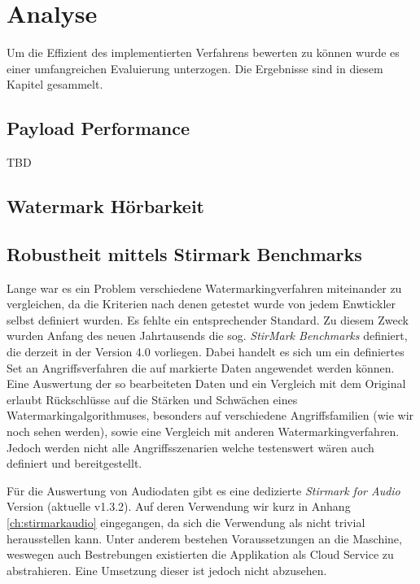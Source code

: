 \chapter{Analyse}
\label{ch:analyse}

Um die Effizient des implementierten Verfahrens bewerten zu können wurde es einer umfangreichen Evaluierung unterzogen. Die Ergebnisse sind in diesem Kapitel gesammelt. 

\section{Payload Performance}
\label{sec:payloadperformance}

TBD

\section{Watermark Hörbarkeit}

\section{Robustheit mittels Stirmark Benchmarks}

Lange war es ein Problem verschiedene Watermarkingverfahren miteinander zu vergleichen, da die Kriterien nach denen getestet wurde von jedem Enwtickler selbst definiert wurden. Es fehlte ein entsprechender Standard. Zu diesem Zweck wurden Anfang des neuen Jahrtausends die sog. \textit{StirMark Benchmarks} definiert\cite{petitcolas2000watermarking}\cite{petitcolas2004stirmark}, die derzeit in der Version 4.0 vorliegen. Dabei handelt es sich um ein definiertes Set an Angriffsverfahren die auf markierte Daten angewendet werden können. Eine Auswertung der so bearbeiteten Daten und ein Vergleich mit dem Original erlaubt Rückschlüsse auf die Stärken und Schwächen eines Watermarkingalgorithmuses, besonders auf verschiedene Angriffsfamilien (wie wir noch sehen werden), sowie eine Vergleich mit anderen Watermarkingverfahren. Jedoch werden nicht alle Angriffsszenarien welche testenswert wären auch definiert und bereitgestellt\cite{steinebach2002stirmark}.

Für die Auswertung von Audiodaten gibt es eine dedizierte \textit{Stirmark for Audio} Version\cite{stirmarkforaudio} (aktuelle v1.3.2). Auf deren Verwendung wir kurz in Anhang \ref{ch:stirmarkaudio} eingegangen, da sich die Verwendung als nicht trivial herausstellen kann. Unter anderem bestehen Voraussetzungen an die Maschine, weswegen auch Bestrebungen existierten die Applikation als Cloud Service zu abstrahieren\cite{petitcolas2001public}. Eine Umsetzung dieser ist jedoch nicht abzusehen. 

